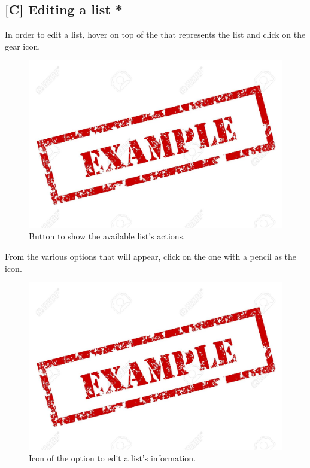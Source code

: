 \subsection{[C] Editing a list *}
In order to edit a list, hover on top of the  that represents the list and click on the gear icon.

\begin{figure}[H]
  \centering 
  \includegraphics[width=\textwidth]{Sections/3-HowToUse/Images/example.jpeg}
  \caption{Button to show the available list's actions.}
\end{figure}

From the various options that will appear, click on the one with a pencil as the icon.

\begin{figure}[H]
  \centering 
  \includegraphics[width=\textwidth]{Sections/3-HowToUse/Images/example.jpeg}
  \caption{Icon of the option to edit a list's information.}
\end{figure}

